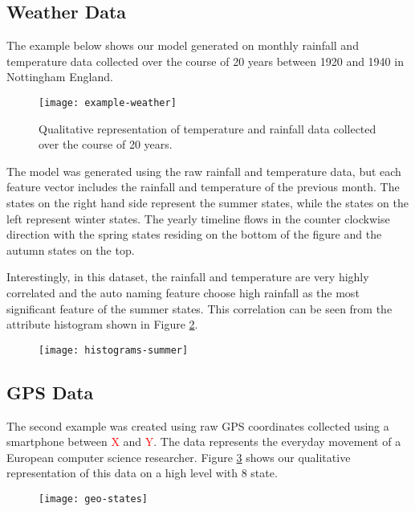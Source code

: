 \subsection{Weather Data}
\label{sec:experiments-weather}

The example below shows our model generated on monthly rainfall and temperature data
collected over the course of 20 years between 1920 and 1940 in Nottingham England.

\begin{figure}[h!]
	\centering
	\texttt{[image: example-weather]}
	\caption{Qualitative representation of temperature and rainfall data collected over the course of 20 years.}
	\label{fig:example-weather}
\end{figure}

The model was generated using the raw rainfall and temperature data, but each feature vector includes
the rainfall and temperature of the previous month. The states on the right hand side represent the 
summer states, while the states on the left represent winter states. The yearly timeline flows in the
counter clockwise direction with the spring states residing on the bottom of the figure and the autumn
states on the top.

Interestingly, in this dataset, the rainfall and temperature are very highly correlated and the auto naming feature
choose high rainfall as the most significant feature of the summer states. This correlation can be seen
from the attribute histogram shown in Figure \ref{fig:histograms-summer}.

\begin{figure}[h!]
	\centering
	\texttt{[image: histograms-summer]}
	\caption{}
	\label{fig:histograms-summer}
\end{figure}

\subsection{GPS Data}

The second example was created using raw GPS coordinates collected using a smartphone between \textcolor{red}{X} and \textcolor{red}{Y}.
The data represents the everyday movement of a European computer science researcher. Figure \ref{fig:example-geo}
shows our qualitative representation of this data on a high level with 8 state.

\begin{figure}[h!]
	\centering
	\texttt{[image: geo-states]}
	\caption{}
	\label{fig:example-geo}
\end{figure}

